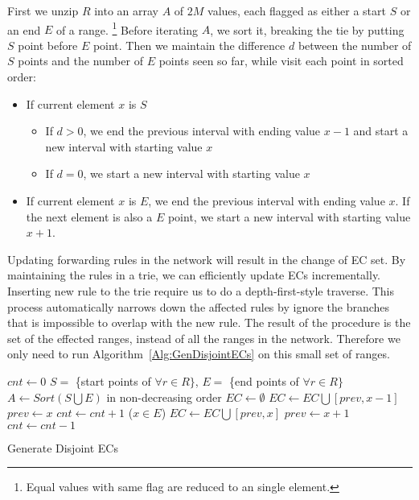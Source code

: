 First we unzip $R$ into an array $A$ of $2M$ values,
each flagged as either a start $S$ or an end $E$ of a range.
\footnote{Equal values with same flag are reduced to an single element.}
Before iterating $A$, we sort it, breaking the tie by putting $S$ point before $E$ point.
Then we maintain the difference $d$ between the number of $S$ points and the number of $E$ points
seen so far, while visit each point in sorted order:
\begin{itemize}
\item If current element $x$ is $S$
        \begin{itemize}
                \item If $d > 0$, we end the previous interval with ending value $x - 1$
                        and start a new interval with starting value $x$
                \item If $d = 0$, we start a new interval with starting value $x$
        \end{itemize}
\item If current element $x$ is $E$, we end the previous interval with ending value $x$.
        If the next element is also a $E$ point, we start a new interval with starting value
        $x + 1$.
\end{itemize}

Updating forwarding rules in the network will result in the change of EC set.
By maintaining the rules in a trie, we can efficiently update ECs incrementally.
Inserting new rule to the trie require us to do a depth-first-style traverse.
This process automatically narrows down the affected rules by ignore the branches
that is impossible to overlap with the new rule.
The result of the procedure is the set of the effected ranges, instead of all the
ranges in the network.
Therefore we only need to run Algorithm~\ref{Alg:GenDisjointECs} on this small set of ranges.

\begin{algorithm}[h]
\DontPrintSemicolon
{}
$cnt \gets 0$\;
$S = $ \{start points of $\forall r \in R\}$, $E = $ \{end points of $\forall r \in R\}$\;
$A \gets Sort(S \bigcup E)$ in non-decreasing order\;
$EC \gets \emptyset$\;
 {
         {
                 {
                        $EC \gets EC \bigcup [prev, x-1]$\;
                }
                $prev \gets x$\;
                $cnt \gets cnt + 1$\;
        }
        \Else ($x \in E$) {
                $EC \gets EC \bigcup [prev, x]$\;
                $prev \gets x + 1$\;
                $cnt \gets cnt - 1$\;
        }
}
\caption{Generate Disjoint ECs\label{Alg:GenDisjointECs}}
\end{algorithm}

